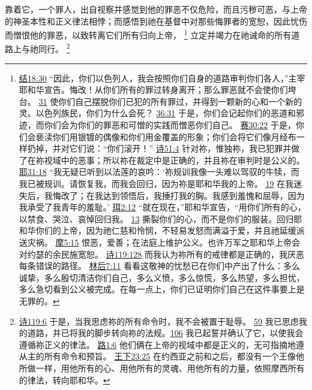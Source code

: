 \documentclass[12pt, a4paper, oneside]{ctexart}
\newcounter{parnum}[section]
\newcommand{\N}{%
   \noindent\refstepcounter{parnum}%
    \makebox[\parindent][l]{\textbf{\arabic{parnum}.}}}
\begin{document}
\N 靠着它，一个罪人，出自视察并感觉到他的罪恶不仅危险，而且污秽可恶，与上帝的神圣本性和正义律法相悖；而感悟到祂在基督中对那些悔罪者的宽恕，因此忧伤而憎恨他的罪恶，以致转离它们所有归向上帝，
	\footnote {
		\href{https://biblehub.com/ezekiel/18-30.htm}{结18:30} “因此，你们以色列人，我会按照你们自身的道路审判你们各人，”主宰耶和华宣告。悔改！从你们所有的罪过转身离开；那么罪恶就不会使你们垮台。
		\href{https://biblehub.com/ezekiel/18-31.htm}{31} 使你们自己摆脱你们已犯的所有罪过，并得到一颗新的心和一个新的灵。以色列族民，你们为什么会死？
		\href{https://biblehub.com/ezekiel/36-31.htm}{36:31} 于是，你们会记起你们的恶道和邪迹，而你们会为你们的罪恶和可憎的实践而憎恶你们自己。
		\href{https://biblehub.com/isaiah/30-22.htm}{赛30:22} 于是，你们会亵渎你们用银镀的偶像和你们用金覆盖的形象；你们会将它们像月经布一样扔掉，并对它们说：“你们滚开！”
		\href{https://biblehub.com/psalms/51-4.htm}{诗51:4} 针对祢，惟独祢，我已犯罪并做了在祢视域中的恶事；所以祢在裁定中是正确的，并且祢在审判时是公义的。
		\href{https://biblehub.com/jeremiah/31-18.htm}{耶31:18} “我无疑已听到以法莲的哀吟：‘祢规训我像一头难以驾驭的牛犊，而我已被规训。请恢复我，而我会回归，因为祢是耶和华我的上帝。
		\href{https://biblehub.com/jeremiah/31-19.htm}{19} 在我迷失后，我悔改了；在我达到领悟后，我捶打我的胸。我感到羞愧和屈辱，因为我承受了我青年的羞耻。’
		\href{https://biblehub.com/joel/2-12.htm}{珥2:12} “就在现在，”耶和华宣告，“用你们所有的心，以禁食、哭泣、哀悼回归我。
		\href{https://biblehub.com/joel/2-13.htm}{13} 撕裂你们的心，而不是你们的服装。回归耶和华你们的上帝，因为祂仁慈和怜悯，不轻易发怒而满溢于爱，并且祂延缓派送灾祸。
		\href{https://biblehub.com/amos/5-15.htm}{摩5:15} 恨恶，爱善；在法庭上维护公义。也许万军之耶和华上帝会对约瑟的余民施宽恕。
		\href{https://biblehub.com/psalms/119-128.htm}{诗119:128} 而我认为祢所有的戒律都是正确的，我厌恶每条错误的路径。
		\href{https://biblehub.com/2_corinthians/7-11.htm}{林后7:11} 看看这敬神的忧愁已在你们中产出了什么：多么诚挚，多么殷切清洁你们自己，多么义愤，多么惊慌，多么热望，多么担忧，多么急切看到公义被完成。在每一点上，你们已证明你们自己在这件事要上是无罪的。
	}
	立定并竭力在祂诫命的所有道路上与祂同行。
	\footnote {
		\href{https://biblehub.com/psalms/119-6.htm}{诗119:6} 于是，当我思虑祢的所有命令时，我不会被置于耻辱。
		\href{https://biblehub.com/psalms/119-59.htm}{59} 我已思虑我的道路，并已将我的脚步转向祢的法规。\href{https://biblehub.com/psalms/119-106.htm}{106} 我已起誓并确认了它，以使我会遵循祢正义的律法。
		\href{https://biblehub.com/luke/1-6.htm}{路1:6} 他们俩在上帝的视域中都是正义的，无可指摘地遵从主的所有命令和预旨。
		\href{https://biblehub.com/2_kings/23-25.htm}{王下23:25} 在约西亚之前和之后，都没有一个王像他所做一样，用他所有的心、用他所有的灵魂、用他所有的力量，依照摩西所有的律法，转向耶和华。
	}
\end{document}
